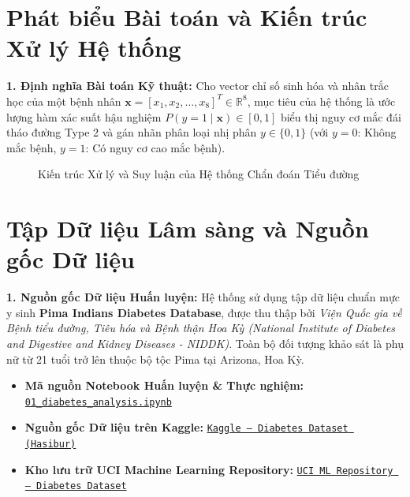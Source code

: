 \documentclass[12pt,a4paper]{report}
\begin{document}
\section{Phát biểu Bài toán và Kiến trúc Xử lý Hệ thống}
\textbf{1. Định nghĩa Bài toán Kỹ thuật:}
Cho vector chỉ số sinh hóa và nhân trắc học của một bệnh nhân $\mathbf{x} = [x_1, x_2, \dots, x_8]^T \in \mathbb{R}^8$, mục tiêu của hệ thống là ước lượng hàm xác suất hậu nghiệm $P(y=1 \mid \mathbf{x}) \in [0, 1]$ biểu thị nguy cơ mắc đái tháo đường Type 2 và gán nhãn phân loại nhị phân $y \in \{0, 1\}$ (với $y=0$: Không mắc bệnh, $y=1$: Có nguy cơ cao mắc bệnh).

\begin{figure}[H]
\centering
{}
\caption{Kiến trúc Xử lý và Suy luận của Hệ thống Chẩn đoán Tiểu đường}
\label{fig:diabetes_arch}
\end{figure}

\section{Tập Dữ liệu Lâm sàng và Nguồn gốc Dữ liệu}
\textbf{1. Nguồn gốc Dữ liệu Huấn luyện:}
Hệ thống sử dụng tập dữ liệu chuẩn mực y sinh \textbf{Pima Indians Diabetes Database}, được thu thập bởi \textit{Viện Quốc gia về Bệnh tiểu đường, Tiêu hóa và Bệnh thận Hoa Kỳ (National Institute of Diabetes and Digestive and Kidney Diseases - NIDDK)}. Toàn bộ đối tượng khảo sát là phụ nữ từ 21 tuổi trở lên thuộc bộ tộc Pima tại Arizona, Hoa Kỳ.
\begin{itemize}[leftmargin=1.5em, itemsep=2pt]
    \item \textbf{Mã nguồn Notebook Huấn luyện \& Thực nghiệm:} \href{https://github.com/phamtu2x5/INTELLIGENT-SYSTEM-DEVELOPMENT/blob/main/src/Week%201/notebooks/01_diabetes_analysis.ipynb}{\texttt{01\_diabetes\_analysis.ipynb}}
    \item \textbf{Nguồn gốc Dữ liệu trên Kaggle:} \href{https://www.kaggle.com/datasets/hasibur013/diabetes-dataset}{\texttt{Kaggle -- Diabetes Dataset (Hasibur)}}
    \item \textbf{Kho lưu trữ UCI Machine Learning Repository:} \href{https://archive.ics.uci.edu/dataset/34/diabetes}{\texttt{UCI ML Repository -- Diabetes Dataset}}
\end{itemize}
\end{document}
